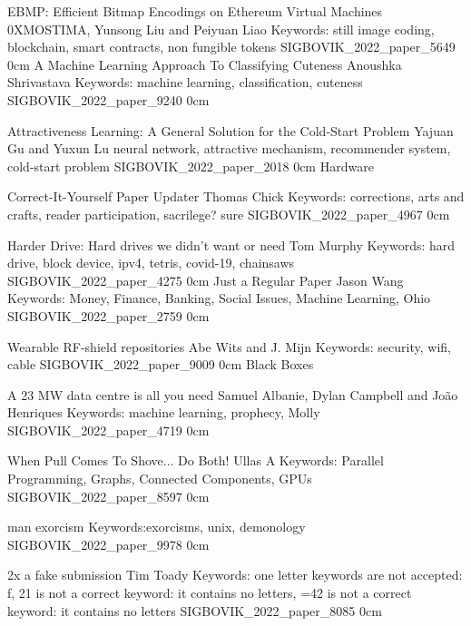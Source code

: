 \addpaper
    {EBMP: Efficient Bitmap Encodings on Ethereum Virtual Machines}
    {0XMOSTIMA, Yunsong Liu and Peiyuan Liao}
    {Keywords: still image coding, blockchain, smart contracts, non fungible tokens}
    {SIGBOVIK_2022_paper_5649}
    {0cm}
    {}
\addpaper
    {A Machine Learning Approach To Classifying Cuteness}
    {Anoushka Shrivastava}
    {Keywords: machine learning, classification, cuteness}
    {SIGBOVIK_2022_paper_9240}
    {0cm}
    {}

\addpaper
    {Attractiveness Learning: A General Solution for the Cold-Start Problem}
    {Yajuan Gu and Yuxun Lu}
    {neural network, attractive mechanism, recommender system, cold-start problem}
    {SIGBOVIK_2022_paper_2018}
    {0cm}
    {}
\addtrack
    {}{Hardware}

\addpaper
    {Correct-It-Yourself Paper Updater}
    {Thomas Chick}
    {Keywords: corrections, arts and crafts, reader participation, sacrilege? sure}
    {SIGBOVIK_2022_paper_4967}
    {0cm}
    {}

\addpaper
    {Harder Drive: Hard drives we didn't want or need}
    {Tom Murphy}
    {Keywords: hard drive, block device, ipv4, tetris, covid-19, chainsaws}
    {SIGBOVIK_2022_paper_4275}
    {0cm}
    {}
\addpaper
    {Just a Regular Paper}
    {Jason Wang}
    {Keywords: Money, Finance, Banking, Social Issues, Machine Learning, Ohio}
    {SIGBOVIK_2022_paper_2759}
    {0cm}
    {}


\addpaper
    {Wearable RF-shield repositories}
    {Abe Wits and J. Mijn}
    {Keywords: security, wifi, cable}
    {SIGBOVIK_2022_paper_9009}
    {0cm}
    {}
\addtrack
    {}{Black Boxes}

\addpaper
    {A 23 MW data centre is all you need}
    {Samuel Albanie, Dylan Campbell and João Henriques}
    {Keywords: machine learning, prophecy, Molly}
    {SIGBOVIK_2022_paper_4719}
    {0cm}
    {}


\addpaper
    {When Pull Comes To Shove... Do Both!}
    {Ullas A}
    {Keywords: Parallel Programming, Graphs, Connected Components, GPUs}
    {SIGBOVIK_2022_paper_8597}
    {0cm}
    {}


\addpaper
    {man exorcism}
    {}
    {Keywords:exorcisms, unix, demonology}
    {SIGBOVIK_2022_paper_9978}
    {0cm}
    {}

\addpaper
    {2x a fake submission}
    {Tim Toady}
    {Keywords: one letter keywords are not accepted: f, 21 is not a correct keyword: it contains no letters, =42 is not a correct keyword: it contains no letters}
    {SIGBOVIK_2022_paper_8085}
    {0cm}
    {}

